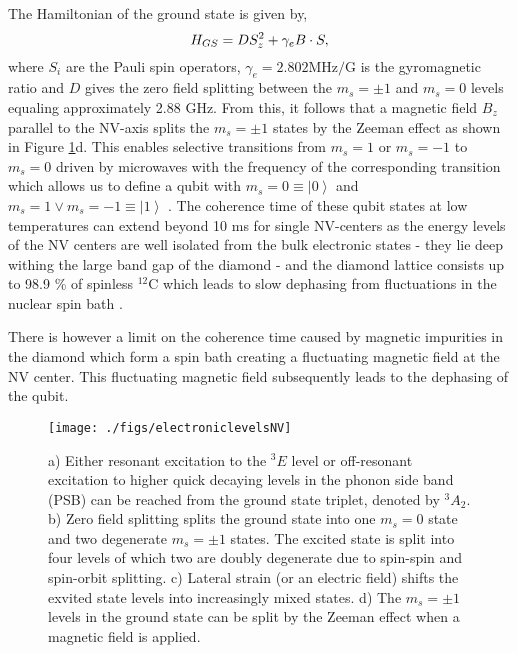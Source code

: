 The Hamiltonian of the ground state is given by,
\begin{equation}
\centering
H_{GS} = DS_{z}^2 + \gamma_e B \cdot S,
\end{equation}
where $S_i$ are the Pauli spin operators, $\gamma_e = 2.802 \mathrm{MHz/G}$ is the gyromagnetic ratio and $D$ gives the zero field splitting between the $m_s \mathrm{= \pm 1}$ and $m_s \mathrm{= 0}$ levels equaling approximately 2.88 GHz. From this, it follows that a magnetic field $B_z$ parallel to the NV-axis splits the  $m_s \mathrm{= \pm 1}$ states by the Zeeman effect as shown in Figure \ref{fig:elec}d. This enables selective transitions from $m_s \mathrm{= 1}$ or $m_s \mathrm{= - 1}$ to $m_s \mathrm{= 0}$  driven by microwaves with the frequency of the corresponding transition which allows us to define a qubit with $m_s \mathrm{= 0} \equiv \left| 0 \right>$ and  $m_s \mathrm{= 1} \lor m_s \mathrm{= -1} \equiv \left| 1 \right>$ .  The coherence time of these qubit states at low temperatures can extend beyond 10 ms for single NV-centers as the energy levels of the NV centers are well isolated from the bulk electronic states - they lie deep withing the large band gap of the diamond - and the diamond lattice consists up to 98.9 \% of spinless $\mathrm{^{12}C}$ which leads to slow dephasing from fluctuations in the nuclear spin bath \cite{bernien2013heralded}. 

There is however a limit on the coherence time caused by magnetic impurities in the diamond which form a spin bath creating a fluctuating magnetic field at the NV center. This fluctuating magnetic field subsequently leads to the dephasing of the qubit. 

\begin{figure}[h!]\centering 
\texttt{[image: ./figs/electroniclevelsNV]}
\caption{a) Either resonant excitation to the $^3E$ level or off-resonant excitation to higher quick decaying levels in the phonon side band (PSB) can be reached from the ground state triplet, denoted by $^3A_2$. b) Zero field splitting splits the ground state into one $m_s = 0$ state and two degenerate $m_s = \pm1$ states. The excited state is split into four levels of which two are doubly degenerate due to spin-spin and spin-orbit splitting. c) Lateral strain (or an electric field) shifts the exvited state levels into increasingly mixed states. d) The $m_s = \pm 1$ levels in the ground state can be split by the Zeeman effect when a magnetic field is applied.}
\label{fig:elec}
\end{figure}


